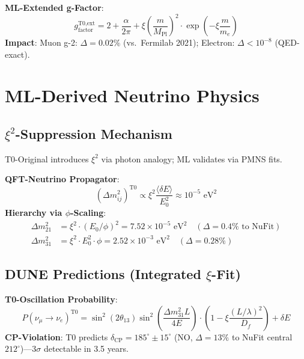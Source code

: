 	\textbf{ML-Extended g-Factor}:
	\begin{equation}
		g_{\text{factor}}^{\text{T0,ext}} = 2 + \frac{\alpha}{2\pi} + \xi \left(\frac{m}{M_{\text{Pl}}}\right)^2 \cdot \exp\left(-\xi \frac{m}{m_e}\right) \tag{ML-Eq.~3.3}
	\end{equation}
	\textbf{Impact}: Muon g-2: $\Delta=0.02\%$ (vs.~Fermilab 2021); Electron: $\Delta<10^{-8}$ (QED-exact).
	
	\section{ML-Derived Neutrino Physics}
	
	\subsection{$\xi^2$-Suppression Mechanism}
	
	T0-Original introduces $\xi^2$ via photon analogy; ML validates via PMNS fits.
	
	\textbf{QFT-Neutrino Propagator}:
	\begin{equation}
		(\Delta m_{ij}^2)^{\text{T0}} \propto \xi^2 \frac{\langle\delta E\rangle}{E_0^2} \approx 10^{-5} \text{ eV}^2 \tag{ML-Eq.~4.1}
	\end{equation}
	\textbf{Hierarchy via $\phi$-Scaling}:
	\begin{align}
		\Delta m_{21}^2 &= \xi^2 \cdot (E_0 / \phi)^2 = 7.52\times10^{-5} \text{ eV}^2 \quad (\Delta=0.4\% \text{ to NuFit}) \tag{ML-Eq.~4.2a} \\
		\Delta m_{31}^2 &= \xi^2 \cdot E_0^2 \cdot \phi = 2.52\times10^{-3} \text{ eV}^2 \quad (\Delta=0.28\%) \tag{ML-Eq.~4.2b}
	\end{align}
	
	\subsection{DUNE Predictions (Integrated $\xi$-Fit)}
	
	\textbf{T0-Oscillation Probability}:
	\begin{equation}
		P(\nu_\mu \to \nu_e)^{\text{T0}} = \sin^2(2\theta_{13}) \sin^2\left(\frac{\Delta m_{31}^2 L}{4E}\right) \cdot \left(1 - \xi \frac{(L/\lambda)^2}{D_f}\right) + \delta E \tag{ML-Eq.~4.3}
	\end{equation}
	\textbf{CP-Violation}: T0 predicts $\delta_{\text{CP}} = 185^\circ \pm 15^\circ$ (NO, $\Delta=13\%$ to NuFit central $212^\circ$)---3$\sigma$ detectable in 3.5 years.
	
